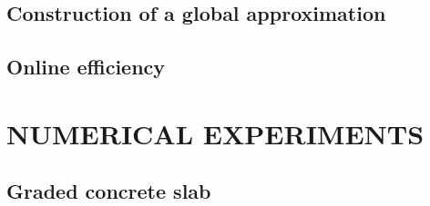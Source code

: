 \documentclass[a4paper]{eccomas_paper-2024}
\begin{document}
\subsection{Construction of a global approximation} %
\label{sub:Construction of a global approximation}


\subsection{Online efficiency} %
\label{sub:Online efficiency}


\section{NUMERICAL EXPERIMENTS} %
\label{sec:numerical experiments}


\subsection{Graded concrete slab} %
\label{sub:Graded concrete slab}

%
%
%
\end{document}
